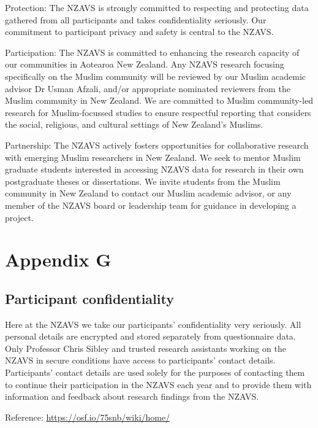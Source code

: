 \documentclass[
]{interact}
\begin{document}
\noindent Protection: The NZAVS is strongly committed to respecting and
protecting data gathered from all participants and takes confidentiality
seriously. Our commitment to participant privacy and safety is central
to the NZAVS.

\noindent Participation: The NZAVS is committed to enhancing the
research capacity of our communities in Aotearoa New Zealand. Any NZAVS
research focusing specifically on the Muslim community will be reviewed
by our Muslim academic advisor Dr Usman Afzali, and/or appropriate
nominated reviewers from the Muslim community in New Zealand. We are
committed to Muslim community-led research for Muslim-focussed studies
to ensure respectful reporting that considers the social, religious, and
cultural settings of New Zealand's Muslims.

\noindent Partnership: The NZAVS actively fosters opportunities for
collaborative research with emerging Muslim researchers in New Zealand.
We seek to mentor Muslim graduate students interested in accessing NZAVS
data for research in their own postgraduate theses or dissertations. We
invite students from the Muslim community in New Zealand to contact our
Muslim academic advisor, or any member of the NZAVS board or leadership
team for guidance in developing a project.

\newpage{}

\section{Appendix G}\label{appendix-g}

\subsection{Participant
confidentiality}\label{participant-confidentiality}

\noindent Here at the NZAVS we take our participants' confidentiality
very seriously. All personal details are encrypted and stored separately
from questionnaire data. Only Professor Chris Sibley and trusted
research assistants working on the NZAVS in secure conditions have
access to participants' contact details. Participants' contact details
are used solely for the purposes of contacting them to continue their
participation in the NZAVS each year and to provide them with
information and feedback about research findings from the NZAVS.

\noindent Reference: \url{https://osf.io/75snb/wiki/home/}
\end{document}
